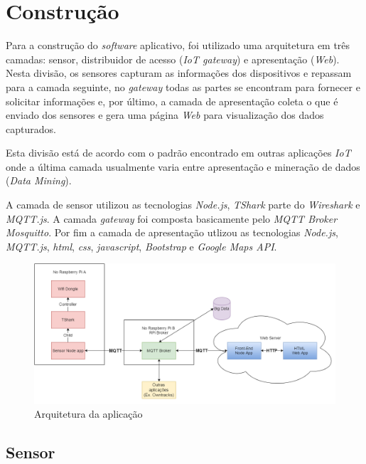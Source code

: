 \chapter{Construção}
\label{chap:Construcao}

Para a construção do \emph{software} aplicativo, foi utilizado uma arquitetura em
três camadas: sensor, distribuidor de acesso (\emph{IoT gateway}) e apresentação
(\emph{Web}). Nesta divisão, os sensores capturam as informações dos dispositivos
e repassam para a camada seguinte, no \emph{gateway} todas as partes se
encontram para fornecer e solicitar informações e, por último, a camada de
apresentação coleta o que é enviado dos sensores e gera uma página \emph{Web}
para visualização dos dados capturados.

Esta divisão está de acordo com o padrão encontrado em outras aplicações
\emph{IoT} onde a última camada usualmente varia entre apresentação e mineração
de dados (\emph{Data Mining}).

A camada de sensor utilizou as tecnologias \emph{Node.js}, \emph{TShark} parte
do \emph{Wireshark} e \emph{MQTT.js}. A camada \emph{gateway} foi composta
basicamente pelo \emph{MQTT Broker} \emph{Mosquitto}. Por fim a camada de
apresentação utlizou as tecnologias \emph{Node.js}, \emph{MQTT.js}, \emph{html},
\emph{css}, \emph{javascript}, \emph{Bootstrap} e \emph{Google Maps API}.

\begin{figure}[htb]
	\caption{\label{fig-arq-app}Arquitetura da aplicação}
	\begin{center}
		\includegraphics[width=1\textwidth]{050-construcao/esquema-proj.png}
	\end{center}
\end{figure}


\section{Sensor}
\label{sec:app-sensor}


